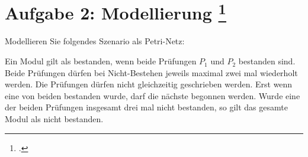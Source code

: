 \documentclass{lehramt-informatik-aufgabe}
\begin{document}

\section{Aufgabe 2: Modellierung
\footcite[Seite 2]{sosy:ab:4}}

Modellieren Sie folgendes Szenario als Petri-Netz:

Ein Modul gilt als bestanden, wenn beide Prüfungen $P_1$ und $P_2$
bestanden sind. Beide Prüfungen dürfen bei Nicht-Bestehen jeweils
maximal zwei mal wiederholt werden. Die Prüfungen dürfen nicht
gleichzeitig geschrieben werden. Erst wenn eine von beiden bestanden
wurde, darf die nächste begonnen werden. Wurde eine der beiden Prüfungen
insgesamt drei mal nicht bestanden, so gilt das gesamte Modul als nicht
bestanden.
\end{document}
